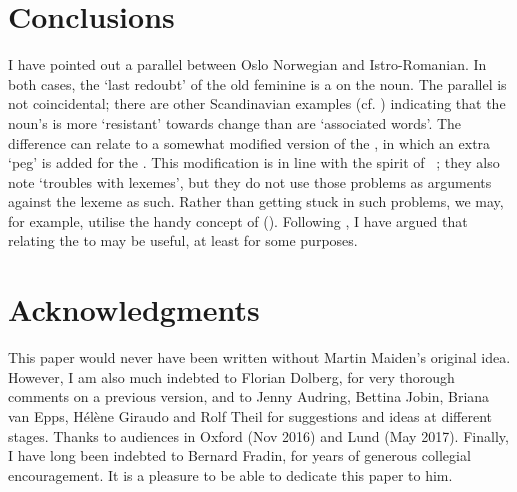 \documentclass[output=paper]{langsci/langscibook}
\begin{document}
\begin{exe}
\begin{xlist}
\begin{xlist}
\section{Conclusions}
\label{sec:enger:5}
I have pointed out a parallel between Oslo Norwegian and Istro-Romanian.
In both cases, the `last redoubt' of the old feminine is a  on the
noun. The parallel is not coincidental; there are other Scandinavian
examples (cf.  ) indicating that the noun's  is more `resistant'
towards change than are `associated words'. The difference can relate to
a somewhat modified version of the  %
\citep{Corbett79,Corbett2006,Kopcke10}%
%
, in which an extra `peg' is added for the
. This modification is in line with the spirit of~\citet{Fradin03b}%
; they also note `troubles with lexemes', but they do
not use those problems as arguments against the lexeme as such. Rather
than getting stuck in such problems, we may, for example, utilise the
handy concept of   (). Following %
\citet{Lehmann82}%
%
, I have argued that relating the  to
 may be useful, at least for some purposes.

\section*{Acknowledgments}

This paper would never have been written without Martin Maiden's original
    idea. However, I am also much indebted to Florian Dolberg, for very
    thorough comments on a previous version, and to Jenny Audring,
    Bettina Jobin, Briana van Epps, Hélène Giraudo and Rolf Theil for
    suggestions and ideas at different stages. Thanks to audiences in
    Oxford (Nov 2016) and Lund (May 2017). Finally, I have long been
    indebted to Bernard Fradin, for years of generous collegial
    encouragement. It is a pleasure to be able to dedicate this paper to
    him.


\end{xlist}
\end{xlist}
\end{exe}
\end{document}
